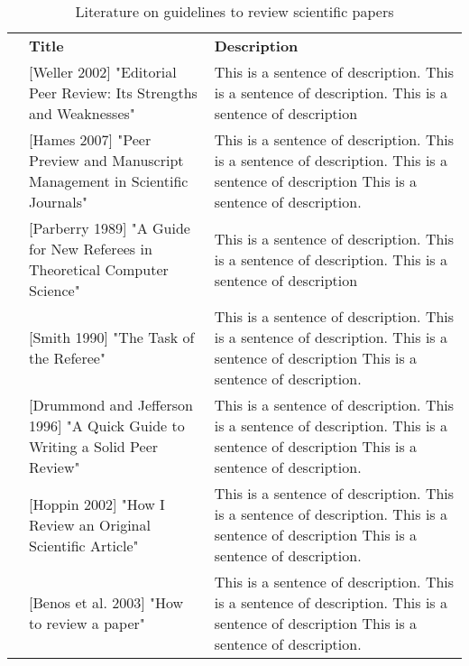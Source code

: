 \documentclass[varwidth]{standalone}
\begin{document}
\begin{table}\footnotesize \ttfamily
\caption{Literature on guidelines to review scientific papers}
\newcommand{\titleWidth}{.33\linewidth}
\newcommand{\oneRow}[3]{
    &#1 \newline 
    #2 & #3
}
\begin{tabularx}{\linewidth}{c|p{\titleWidth}|X|} 
    \cline{2-3}
     & \textbf{Title} & \textbf{Description}\\ \hhline {-==}
    \multicolumn{1}{|c||}{ \multirow{2}{*}[-15pt]{\rotatebox[origin=c]{90}{\textbf{Books}}}}
    \oneRow{[Weller 2002]}{"Editorial Peer Review: Its Strengths and Weaknesses"}{This is a sentence of description. This is a sentence of description. This is a sentence of description}  \\ \cline{2-3} 
    \multicolumn{1}{|c||}{
    } \oneRow{[Hames 2007]}{"Peer Preview and Manuscript Management in Scientific Journals"}{This is a sentence of description. This is a sentence of description. This is a sentence of description This is a sentence of description.}  \\ \hhline{===}
    \multicolumn{1}{|c||}{ \multirow{6}{*}[-60pt]{\rotatebox[origin=c]{90}{\textbf{Journal Articles}}}}
    \oneRow{[Parberry 1989]}{"A Guide for New Referees in Theoretical Computer Science"}{This is a sentence of description. This is a sentence of description. This is a sentence of description}  \\ \cline{2-3} 
    \multicolumn{1}{|c||}{} \oneRow{[Smith 1990]}{"The Task of the Referee"}{This is a sentence of description. This is a sentence of description. This is a sentence of description This is a sentence of description.}  \\ \cline{2-3}
    \multicolumn{1}{|c||}{} \oneRow{[Drummond and Jefferson 1996]}{"A Quick Guide to Writing a Solid Peer Review"}{This is a sentence of description. This is a sentence of description. This is a sentence of description This is a sentence of description.}  \\ \cline{2-3}
    \multicolumn{1}{|c||}{} \oneRow{[Hoppin 2002]}{"How I Review an Original Scientific Article"}{This is a sentence of description. This is a sentence of description. This is a sentence of description This is a sentence of description.}  \\ \cline{2-3}
    \multicolumn{1}{|c||}{} \oneRow{[Benos et al. 2003]}{"How to review a paper"}{This is a sentence of description. This is a sentence of description. This is a sentence of description This is a sentence of description.}  \\ \cline{2-3}

\end{tabularx}
\end{table}
\end{document}

